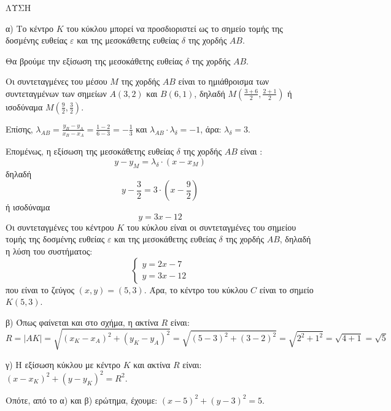 ΛΥΣΗ


α) Το κέντρο $K$ του κύκλου μπορεί να προσδιοριστεί ως το σημείο τομής της δοσμένης ευθείας $\varepsilon$ και της μεσοκάθετης ευθείας $\delta$ της χορδής $AB$.

Θα βρούμε την εξίσωση της μεσοκάθετης ευθείας $\delta$ της χορδής $AB$.

Οι συντεταγμένες του μέσου $M$ της χορδής $AB$ είναι το ημιάθροισμα των συντεταγμένων των σημείων $A(3, 2)$ και $B(6, 1)$, δηλαδή $M\left(\frac{3+6}{2}, \frac{2+1}{2}\right)$ ή ισοδύναμα $M\left(\frac{9}{2}, \frac{3}{2}\right)$.

Επίσης, $\lambda_{AB} = \frac{y_B - y_A}{x_B - x_A} = \frac{1-2}{6-3} = -\frac{1}{3}$ και $\lambda_{AB} \cdot \lambda_\delta = -1$, άρα: $\lambda_\delta = 3$.

Επομένως, η εξίσωση της μεσοκάθετης ευθείας $\delta$ της χορδής $AB$ είναι :
\[
y - y_M = \lambda_\delta \cdot (x - x_M)
\]
δηλαδή
\[
y - \frac{3}{2} = 3 \cdot \left(x - \frac{9}{2}\right)
\]
ή ισοδύναμα
\[
y = 3x - 12
\]
Οι συντεταγμένες του κέντρου $K$ του κύκλου είναι οι συντεταγμένες του σημείου τομής της δοσμένης ευθείας $\varepsilon$ και της μεσοκάθετης ευθείας $\delta$ της χορδής $AB$, δηλαδή η λύση του συστήματος:
\[
\begin{cases}
y = 2x - 7 \\
y = 3x - 12
\end{cases}
\]
που είναι το ζεύγος $(x,y) = (5,3)$. Άρα, το κέντρο του κύκλου $C$ είναι το σημείο $K(5,3)$.

β) Όπως φαίνεται και στο σχήμα, η ακτίνα $R$ είναι:
\[
R = |AK| = \sqrt{(x_K - x_A)^2 + (y_K - y_A)^2} = \sqrt{(5-3)^2 + (3-2)^2} = \sqrt{2^2 + 1^2} = \sqrt{4+1} = \sqrt{5}
\]

γ) Η εξίσωση κύκλου με κέντρο $K$ και ακτίνα $R$ είναι: $(x - x_K)^2 + (y - y_K)^2 = R^2$.

Οπότε, από το α) και β) ερώτημα, έχουμε: $(x - 5)^2 + (y - 3)^2 = 5$.
\endlysh